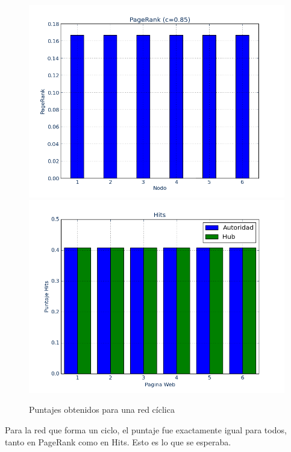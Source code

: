 \documentclass[a4paper]{article}
\begin{document}
\newpage

\begin{figure}[htbp]
\centering
\includegraphics[scale=0.385]{img/hexaout.png}
\includegraphics[scale=0.385]{img/hexaoutH.png}
\caption{Puntajes obtenidos para una red cíclica}
\end{figure}

Para la red que forma un ciclo, el puntaje fue exactamente igual para todos, tanto en PageRank como en Hits. Esto es lo que se esperaba.


\end{document}
